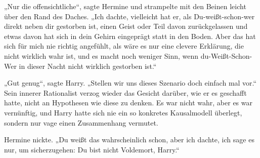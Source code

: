 „Nur die offensichtliche“, sagte Hermine und strampelte mit den Beinen leicht über den Rand des Daches.
„Ich dachte, vielleicht hat er, als Du-weißt-schon-wer direkt neben dir gestorben ist, einen Geist oder Teil davon zurückgelassen und etwas davon hat sich in dein Gehirn eingeprägt statt in den Boden. Aber das hat sich für mich nie richtig angefühlt, als wäre es nur eine clevere Erklärung, die nicht wirklich wahr ist, und es macht noch weniger Sinn, wenn du-Weißt-Schon-Wer in dieser Nacht nicht wirklich gestorben ist.“

„Gut genug“, sagte Harry.
„Stellen wir uns dieses Szenario doch einfach mal vor.“
Sein innerer Rationalist verzog wieder das Gesicht darüber, wie er es geschafft hatte, nicht an Hypothesen wie diese zu denken. Es war nicht wahr, aber es war vernünftig, und Harry hatte sich nie ein so konkretes Kausalmodell überlegt, sondern nur vage einen Zusammenhang vermutet.

Hermine nickte.
„Du weißt das wahrscheinlich schon, aber ich dachte, ich sage es nur, um sicherzugehen: Du bist nicht Voldemort, Harry.“

